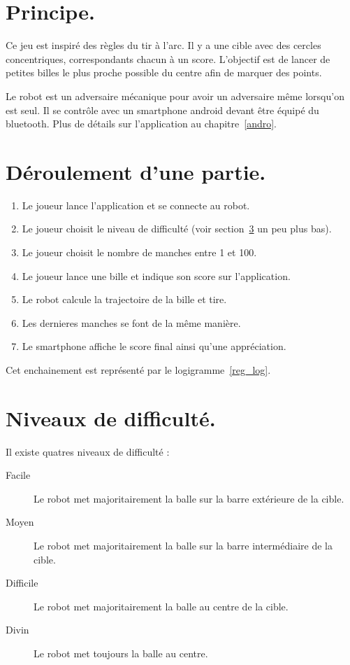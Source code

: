 \section{Principe.}

Ce jeu est inspiré des règles du tir à l'arc. Il y a une cible avec des cercles concentriques, correspondants chacun à un score. L'objectif est de lancer de petites billes le plus proche possible du centre afin de marquer des points.

Le robot est un adversaire mécanique pour avoir un adversaire même lorsqu'on est seul. Il se contrôle avec un smartphone android devant être équipé du bluetooth. Plus de détails sur l'application au chapitre~\ref{andro}.

\section{Déroulement d'une partie.}
\begin{enumerate}
	\item Le joueur lance l'application et se connecte au robot.
	\item Le joueur choisit le niveau de difficulté (voir section~\ref{reg_dif} un peu plus bas).
	\item Le joueur choisit le nombre de manches entre 1 et 100.
	\item Le joueur lance une bille et indique son score sur l'application.
	\item Le robot calcule la trajectoire de la bille et tire.
	\item Les dernieres manches se font de la même manière.
	\item Le smartphone affiche le score final ainsi qu'une appréciation.
\end{enumerate}

Cet enchainement est représenté par le logigramme~\ref{reg_log}.

\section{Niveaux de difficulté.} \label{reg_dif}
Il existe quatres niveaux de difficulté : \begin{description}
	\item[Facile] Le robot met majoritairement la balle sur la barre extérieure de la cible.
	\item[Moyen] Le robot met majoritairement la balle sur la barre intermédiaire de la cible.
	\item[Difficile] Le robot met majoritairement la balle au centre de la cible.
	\item[Divin] Le robot met toujours la balle au centre.
\end{description}

